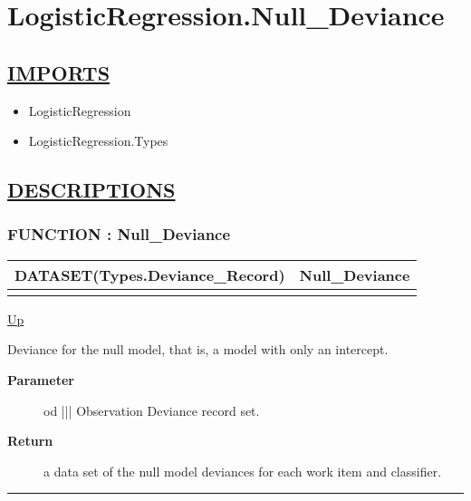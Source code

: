 \chapter*{LogisticRegression.Null\_Deviance}
\hypertarget{ecldoc:toc:LogisticRegression.Null_Deviance}{}

\section*{\underline{IMPORTS}}
\begin{itemize}
\item LogisticRegression
\item LogisticRegression.Types
\end{itemize}

\section*{\underline{DESCRIPTIONS}}
\subsection*{FUNCTION : Null\_Deviance}
\hypertarget{ecldoc:logisticregression.null_deviance}{}

{\renewcommand{\arraystretch}{1.5}
\begin{tabularx}{\textwidth}{|>{\raggedright\arraybackslash}l|X|}
\hline
\hspace{0pt}DATASET(Types.Deviance\_Record) & Null\_Deviance \\
\hline
\multicolumn{2}{|>{\raggedright\arraybackslash}X|}{\hspace{0pt}(DATASET(Types.Observation\_Deviance) od)} \\
\hline
\end{tabularx}
}

\hyperlink{ecldoc:toc:LogisticRegression}{Up}

\par
Deviance for the null model, that is, a model with only an intercept.

\par
\begin{description}
\item [\textbf{Parameter}] od ||| Observation Deviance record set.
\item [\textbf{Return}] a data set of the null model deviances for each work item and classifier.
\end{description}

\rule{\textwidth}{0.4pt}
